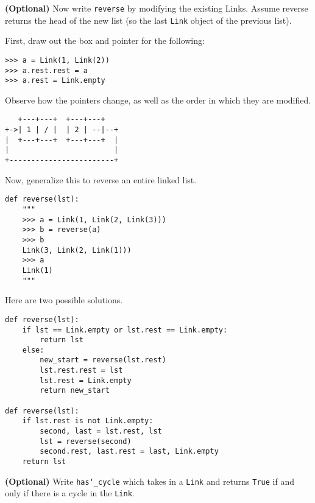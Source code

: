 \documentclass{exam}
\begin{document}
\begin{questions}
\begin{blocksection}
\question \textbf{(Optional)} Now write \texttt{reverse} by modifying the existing Links. Assume reverse returns the head of the new list (so the last \texttt{Link} object of the previous list).

First, draw out the box and pointer for the following:
\begin{lstlisting}
>>> a = Link(1, Link(2))
>>> a.rest.rest = a
>>> a.rest = Link.empty
\end{lstlisting}
Observe how the pointers change, as well as the order in which they are
modified.
\begin{solution}[0.6in]
\begin{lstlisting}
   +---+---+  +---+---+
+->| 1 | / |  | 2 | --|--+
|  +---+---+  +---+---+  |
|                        |
+------------------------+
\end{lstlisting}
\end{solution}
\end{blocksection}

\begin{blocksection}
Now, generalize this to reverse an entire linked list.
\begin{lstlisting}
def reverse(lst):
    """
    >>> a = Link(1, Link(2, Link(3)))
    >>> b = reverse(a)
    >>> b
    Link(3, Link(2, Link(1)))
    >>> a
    Link(1)
    """
\end{lstlisting}
\begin{solution}[1.00in]
Here are two possible solutions.
\begin{lstlisting}
def reverse(lst):
    if lst == Link.empty or lst.rest == Link.empty:
        return lst
    else:
        new_start = reverse(lst.rest)
        lst.rest.rest = lst
        lst.rest = Link.empty
        return new_start

def reverse(lst):
    if lst.rest is not Link.empty:
        second, last = lst.rest, lst
        lst = reverse(second)
        second.rest, last.rest = last, Link.empty
    return lst
\end{lstlisting}
\end{solution}


\end{blocksection}

\begin{blocksection}
\question \textbf{(Optional)} Write \texttt{has\char`_cycle} which takes in a
\texttt{Link} and returns \texttt{True} if and only if there is a cycle in the
\texttt{Link}.


\end{blocksection}
\end{questions}
\end{document}
